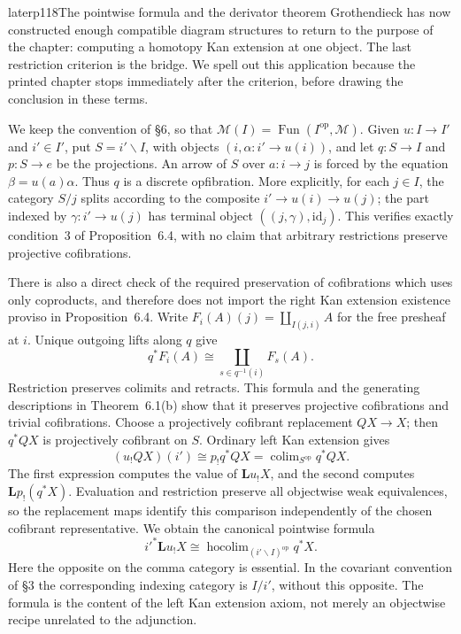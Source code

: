 \begin{dcomment}{later}{p118}{The pointwise formula and the derivator theorem}
Grothendieck has now constructed enough compatible diagram structures to return to the purpose of the chapter: computing a homotopy Kan extension at one object. The last restriction criterion is the bridge. We spell out this application because the printed chapter stops immediately after the criterion, before drawing the conclusion in these terms.

We keep the convention of \S6, so that $\mathcal M(I)=\operatorname{Fun}(I^{\mathrm{op}},\mathcal M)$. Given $u:I\to I'$ and $i'\in I'$, put $S=i'\backslash I$, with objects $(i,\alpha:i'\to u(i))$, and let $q:S\to I$ and $p:S\to e$ be the projections. An arrow of $S$ over $a:i\to j$ is forced by the equation $\beta=u(a)\alpha$. Thus $q$ is a discrete opfibration. More explicitly, for each $j\in I$, the category $S/j$ splits according to the composite $i'\to u(i)\to u(j)$; the part indexed by $\gamma:i'\to u(j)$ has terminal object $((j,\gamma),\mathrm{id}_j)$. This verifies exactly condition~3 of Proposition~6.4, with no claim that arbitrary restrictions preserve projective cofibrations.

There is also a direct check of the required preservation of cofibrations which uses only coproducts, and therefore does not import the right Kan extension existence proviso in Proposition~6.4. Write $F_i(A)(j)=\coprod_{I(j,i)}A$ for the free presheaf at $i$. Unique outgoing lifts along $q$ give
\[
 q^*F_i(A)\cong\coprod_{s\in q^{-1}(i)}F_s(A).
\]
Restriction preserves colimits and retracts. This formula and the generating descriptions in Theorem~6.1(b) show that it preserves projective cofibrations and trivial cofibrations. Choose a projectively cofibrant replacement $QX\to X$; then $q^*QX$ is projectively cofibrant on $S$. Ordinary left Kan extension gives
\[
 (u_!QX)(i')\cong p_!q^*QX
   =\mathop{\mathrm{colim}}_{S^{\mathrm{op}}}q^*QX.
\]
The first expression computes the value of $\mathbf L u_!X$, and the second computes $\mathbf Lp_!(q^*X)$. Evaluation and restriction preserve all objectwise weak equivalences, so the replacement maps identify this comparison independently of the chosen cofibrant representative. We obtain the canonical pointwise formula
\[
 i'^*\mathbf L u_!X\cong
 \mathop{\mathrm{hocolim}}_{(i'\backslash I)^{\mathrm{op}}}q^*X.
\]
Here the opposite on the comma category is essential. In the covariant convention of \S3 the corresponding indexing category is $I/i'$, without this opposite. The formula is the content of the left Kan extension axiom, not merely an objectwise recipe unrelated to the adjunction.


\end{dcomment}
